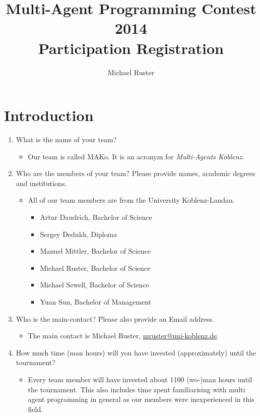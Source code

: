 \documentclass{llncs}
\begin{document}
\title{Multi-Agent Programming Contest 2014\\Participation Registration}
\author{Michael Ruster}
\maketitle

\section*{Introduction}

\begin{enumerate}
\item What is the name of your team?
  \begin{itemize}
    \item Our team is called MAKo. It is an acronym for \emph{Multi-Agents Koblenz}.
  \end{itemize}
\item Who are the members of your team? Please provide names, academic degrees and institutions.
  \begin{itemize}
    \item All of our team members are from the University Koblenz-Landau.\begin{itemize}
    \item Artur Daudrich, Bachelor of Science
    \item Sergey Dedukh, Diploma
    \item Manuel Mittler, Bachelor of Science
    \item Michael Ruster, Bachelor of Science
    \item Michael Sewell, Bachelor of Science
    \item Yuan Sun, Bachelor of Management
  \end{itemize}
  \end{itemize}
\item Who is the main-contact? Please also provide an Email address.
  \begin{itemize}
    \item The main contact is Michael Ruster, \href{mailto:mruster@uni-koblenz.de}{mruster@uni-koblenz.de}.
  \end{itemize}
\item How much time (man hours) will you have invested (approximately) until the tournament?
  \begin{itemize}
    \item Every team member will have invested about 1100 (wo-)man hours until the tournament. This also includes time spent familiarising with multi agent programming in general as our members were inexperienced in this field.
  \end{itemize}

\end{enumerate}
\end{document}
